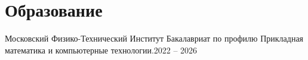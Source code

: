 \section{Образование}
\resumeSubHeadingListStart
\resumeSubheading
{Московский Физико-Технический Институт}{}
{Бакалавриат по профилю Прикладная математика и компьютерные технологии.}{2022 -- 2026}
\resumeSubHeadingListEnd